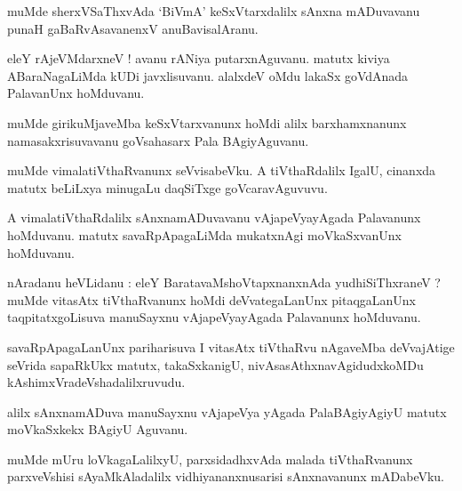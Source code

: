 \documentclass{article}
\begin{document}
\begin{mn}
muMde sherxVSaThxvAda `BiVmA' keSxVtarxdalilx sAnxna mADuvavanu punaH gaBaRvAsavanenxV 
anuBavisalAranu.
\end{mn}

\begin{mn}
eleY rAjeVMdarxneV ! avanu rANiya putarxnAguvanu. matutx kiviya ABaraNagaLiMda kUDi javxlisuvanu. 
alalxdeV oMdu lakaSx goVdAnada PalavanUnx hoMduvanu.
\end{mn}

\begin{mn}
muMde girikuMjaveMba keSxVtarxvanunx hoMdi alilx barxhamxnanunx namasakxrisuvavanu goVsahasarx Pala
BAgiyAguvanu.
\end{mn}

\begin{mn}
muMde vimalatiVthaRvanunx seVvisabeVku. A tiVthaRdalilx IgalU, cinanxda matutx beLiLxya minugaLu
daqSiTxge goVcaravAguvuvu.
\end{mn}

\begin{mn}
A vimalatiVthaRdalilx sAnxnamADuvavanu vAjapeVyayAgada Palavanunx hoMduvanu. matutx 
savaRpApagaLiMda mukatxnAgi moVkaSxvanUnx hoMduvanu.
\end{mn}


\begin{mn}
nAradanu heVLidanu : eleY BaratavaMshoVtapxnanxnAda yudhiSiThxraneV ? muMde  vitasAtx tiVthaRvanunx 
hoMdi deVvategaLanUnx pitaqgaLanUnx taqpitatxgoLisuva manuSayxnu vAjapeVyayAgada Palavanunx  
hoMduvanu.
\end{mn}

\begin{mn}
savaRpApagaLanUnx pariharisuva I vitasAtx tiVthaRvu nAgaveMba deVvajAtige seVrida sapaRkUkx 
matutx, takaSxkanigU, nivAsasAthxnavAgidudxkoMDu kAshimxVradeVshadalilxruvudu.
\end{mn}

\begin{mn}
alilx sAnxnamADuva manuSayxnu vAjapeVya yAgada PalaBAgiyAgiyU matutx moVkaSxkekx BAgiyU Aguvanu.
\end{mn}

\begin{mn}
muMde mUru loVkagaLalilxyU, parxsidadhxvAda malada tiVthaRvanunx parxveVshisi sAyaMkAladalilx 
vidhiyananxnusarisi sAnxnavanunx mADabeVku.
\end{mn}
\end{document}
